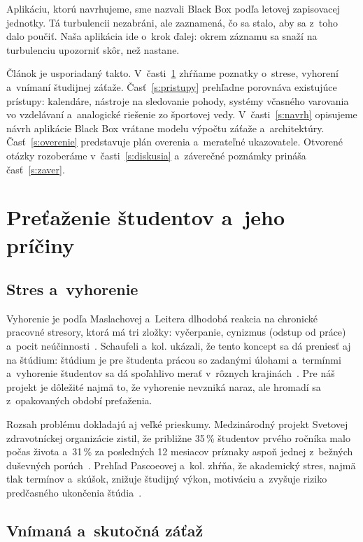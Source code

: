 \documentclass[10pt,twoside,slovak,a4paper]{article}
\begin{document}
Aplikáciu, ktorú navrhujeme, sme nazvali Black Box podľa letovej
zapisovacej jednotky. Tá turbulencii nezabráni, ale zaznamená, čo sa stalo,
aby sa z~toho dalo poučiť. Naša aplikácia ide o~krok ďalej: okrem záznamu sa
snaží na turbulenciu upozorniť skôr, než nastane.

Článok je usporiadaný takto. V~časti~\ref{s:problem} zhŕňame poznatky
o~strese, vyhorení a~vnímaní študijnej záťaže. Časť~\ref{s:pristupy}
prehľadne porovnáva existujúce prístupy: kalendáre, nástroje na sledovanie
pohody, systémy včasného varovania vo vzdelávaní a~analogické riešenie zo
športovej vedy. V~časti~\ref{s:navrh} opisujeme návrh aplikácie Black Box
vrátane modelu výpočtu záťaže a~architektúry. Časť~\ref{s:overenie} predstavuje
plán overenia a~merateľné ukazovatele. Otvorené otázky rozoberáme
v~časti~\ref{s:diskusia} a~záverečné poznámky prináša časť~\ref{s:zaver}.



\section{Preťaženie študentov a~jeho príčiny} \label{s:problem}

\subsection{Stres a~vyhorenie}

Vyhorenie je podľa Maslachovej a~Leitera dlhodobá reakcia na chronické
pracovné stresory, ktorá má tri zložky: vyčerpanie, cynizmus (odstup od
práce) a~pocit neúčinnosti~\cite{Maslach:Burnout}. Schaufeli a~kol. ukázali,
že tento koncept sa dá preniesť aj na štúdium: štúdium je pre študenta prácou
so zadanými úlohami a~termínmi a~vyhorenie študentov sa dá spoľahlivo merať
v~rôznych krajinách~\cite{Schaufeli:Burnout}. Pre náš projekt je dôležité
najmä to, že vyhorenie nevzniká naraz, ale hromadí sa z~opakovaných období
preťaženia.

Rozsah problému dokladajú aj veľké prieskumy. Medzinárodný projekt Svetovej
zdravotníckej organizácie zistil, že približne 35\,\% študentov prvého
ročníka malo počas života a~31\,\% za posledných 12 mesiacov príznaky
aspoň jednej z~bežných duševných porúch~\cite{Auerbach:WMH}. Prehľad Pascoeovej
a~kol. zhŕňa, že akademický stres, najmä tlak termínov a~skúšok, znižuje
študijný výkon, motiváciu a~zvyšuje riziko predčasného ukončenia
štúdia~\cite{Pascoe:Stress}.

\subsection{Vnímaná a~skutočná záťaž}
\end{document}
